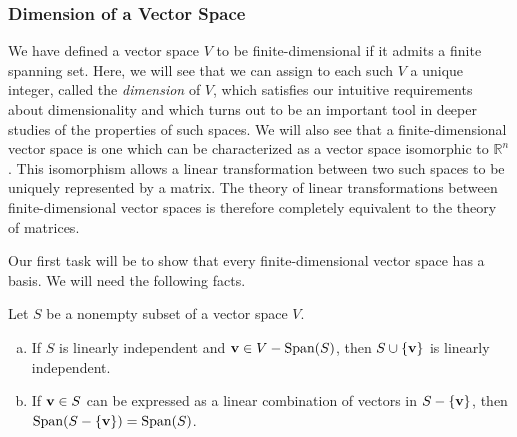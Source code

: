 \documentclass[12pt,letterpaper,reqno]{article}
\numberwithin{equation}{section}
\begin{document}
\subsubsection{Dimension of a Vector Space}
We have defined a vector space $V$ to be finite-dimensional if it admits a finite spanning set. Here, we will see that we can assign to each such $V$ a unique integer, called the \emph{dimension} of $V$, which satisfies our intuitive requirements about dimensionality and which turns out to be an important tool in deeper studies of the properties of such spaces. We will also see that a finite-dimensional vector space is one which can be characterized as a vector space isomorphic to $\mathbb{R}^n$. This isomorphism allows a linear transformation between two such spaces to be uniquely represented by a matrix. The theory of linear transformations between finite-dimensional vector spaces is therefore completely equivalent to the theory of matrices.

Our first task will be to show that every finite-dimensional vector space has a basis. We will need the following facts.
\begin{lem} Let $S$ be a nonempty subset of a vector space $V$.
\begin{enumerate}[(a)]
	\item If $S$ is linearly independent and ${\bf v}\in V-\text{Span}(S)$, then $S\cup \{{\bf v}\}$ is linearly independent.
	\item If ${\bf v} \in S$ can be expressed as a linear combination of vectors in $S-\{ {\bf v}\}$, then $\text{Span}(S-\{ {\bf v}\})=\text{Span}(S)$.
\end{enumerate}
\end{lem}
\end{document}
